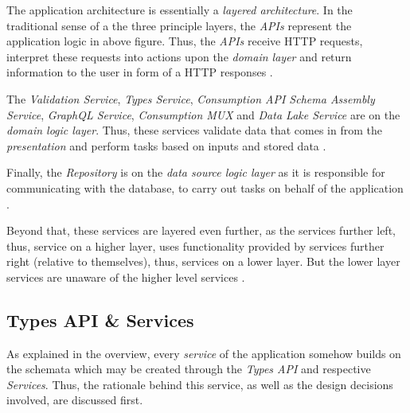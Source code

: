 The application architecture is essentially a \emph{layered architecture}. In the traditional sense of a the three principle layers, the \emph{APIs} represent the application logic in above figure. Thus, the \emph{APIs} receive HTTP requests, interpret these requests into actions upon the \emph{domain layer} and return information to the user in form of a HTTP responses \cite{AppArchitecture}.\par
The \emph{Validation Service}, \emph{Types Service}, \emph{Consumption API Schema Assembly Service}, \emph{GraphQL Service}, \emph{Consumption MUX} and \emph{Data Lake Service} are on the \emph{domain logic layer}. Thus, these services validate data that comes in from the \emph{presentation} and perform tasks based on inputs and stored data \cite{AppArchitecture}.\par
Finally, the \emph{Repository} is on the \emph{data source logic layer} as it is responsible for communicating with the database, to carry out tasks on behalf of the application \cite{AppArchitecture}.\par
Beyond that, these services are layered even further, as the services further left, thus, service on a higher layer, uses functionality provided by services further right (relative to themselves), thus, services on a lower layer. But the lower layer services are unaware of the higher level services \cite{AppArchitecture}.


\subsection{Types API \& Services}
As explained in the overview, every \emph{service} of the application somehow builds on the schemata which may be created through the \emph{Types API} and respective \emph{Services}. Thus, the rationale behind this service, as well as the design decisions involved, are discussed first.\par

